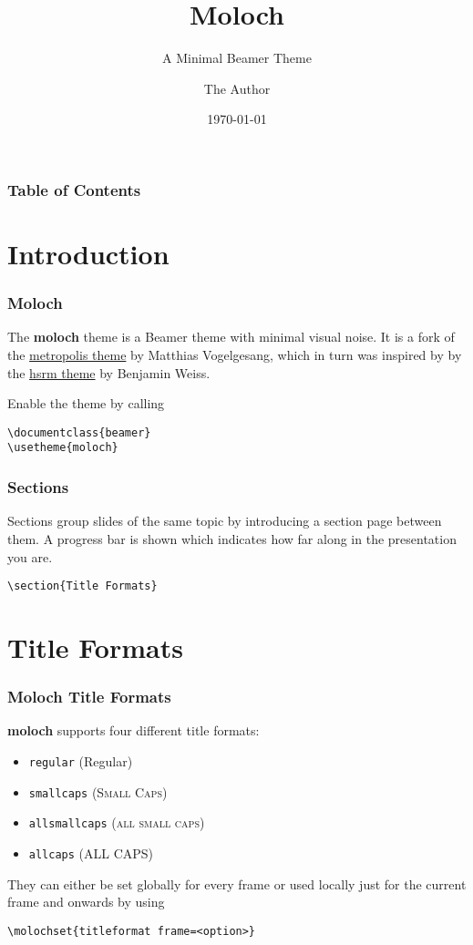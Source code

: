 \documentclass[10pt]{beamer}
\title{Moloch}
\subtitle{A Minimal Beamer Theme}
\date{\today}
\author{The Author}
\institute{Some Institution, Some University}
\newcommand{\themename}{\textbf{moloch}\xspace}
\begin{document}
\maketitle

\begin{frame}
  \frametitle{Table of Contents}
  \tableofcontents[hideallsubsections]
\end{frame}

\section{Introduction}

\begin{frame}[fragile]
  \frametitle{Moloch}

  The \themename theme is a Beamer theme with minimal visual noise. It is a fork of the
  \href{https://github.com/matze/mtheme}{metropolis theme} by Matthias Vogelgesang, which in
  turn was inspired by by the \href{https://github.com/hsrmbeamertheme/hsrmbeamertheme}{hsrm
    theme} by Benjamin Weiss. \medskip

  Enable the theme by calling
  \begin{verbatim}\documentclass{beamer}
\usetheme{moloch}\end{verbatim}
\end{frame}
\begin{frame}[fragile]
  \frametitle{Sections}
  Sections group slides of the same topic by introducing a section page between them. A progress bar is shown which indicates how far along in the presentation you are.

  \begin{verbatim}\section{Title Formats}\end{verbatim}
\end{frame}

\section{Title Formats}

\begin{frame}[fragile]
  \frametitle{Moloch Title Formats}
  \themename supports four different title formats:
  \begin{itemize}
    \item \texttt{regular} (Regular)
    \item \texttt{smallcaps} (\textsc{Small Caps})
    \item \texttt{allsmallcaps} (\textsc{all small caps})
    \item \texttt{allcaps} (ALL CAPS)
  \end{itemize}

  They can either be set globally for every frame or used locally just for the current frame
  and onwards by using
  \begin{verbatim}\molochset{titleformat frame=<option>}\end{verbatim}
\end{frame}
\end{document}
